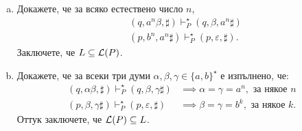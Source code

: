 \begin{example}
  \begin{enumerate}[a)]
  \item
    Докажете, че за всяко естествено число $n$,
    \begin{align*}
      & (q, a^n\beta, \sharp) \vdash^\star_P (q, \beta, a^n\sharp)\\
      & (p, b^n, a^n\sharp) \vdash^\star_P (p, \varepsilon,\sharp).
    \end{align*}
    Заключете, че $L \subseteq \mathcal{L}(P)$.
  \item
    Докажете, че за всеки три думи $\alpha,\beta, \gamma \in \{a,b\}^\star$ е изпълнено, че:
    \begin{align*}
      (q, \alpha\beta, \sharp) \vdash^\star_P (q, \beta, \gamma\sharp)  & \implies \alpha = \gamma = a^n, \text{ за някое }n\\
      (p, \beta, \gamma\sharp) \vdash^\star_P (p, \varepsilon, \sharp) & \implies \beta = \gamma = b^k, \text{ за някое }k.
    \end{align*}
    Оттук заключете, че $\mathcal{L}(P) \subseteq L$.    
  \end{enumerate}
  
\end{example}

